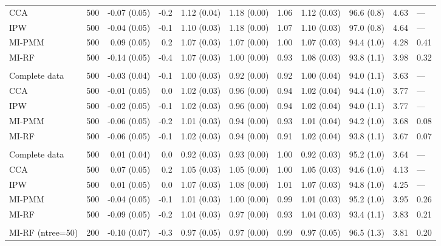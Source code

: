 \begin{longtable}{l|rrrrrrrrrl}
CCA & 500 & -0.07 (0.05) & -0.2 & 1.12 (0.04) & 1.18 (0.00) & 1.06 & 1.12 (0.03) & 96.6 (0.8) & 4.63 & — \\ 
IPW & 500 & -0.04 (0.05) & -0.1 & 1.10 (0.03) & 1.18 (0.00) & 1.07 & 1.10 (0.03) & 97.0 (0.8) & 4.64 & — \\ 
MI-PMM & 500 & 0.09 (0.05) & 0.2 & 1.07 (0.03) & 1.07 (0.00) & 1.00 & 1.07 (0.03) & 94.4 (1.0) & 4.28 & 0.41 \\ 
MI-RF & 500 & -0.14 (0.05) & -0.4 & 1.07 (0.03) & 1.00 (0.00) & 0.93 & 1.08 (0.03) & 93.8 (1.1) & 3.98 & 0.32 \\ 
\midrule\addlinespace[2.5pt]
\multicolumn{11}{l}{Stunting — MAR 10\%} \\[2.5pt] 
\midrule\addlinespace[2.5pt]
Complete data & 500 & -0.03 (0.04) & -0.1 & 1.00 (0.03) & 0.92 (0.00) & 0.92 & 1.00 (0.04) & 94.0 (1.1) & 3.63 & — \\ 
CCA & 500 & -0.01 (0.05) & 0.0 & 1.02 (0.03) & 0.96 (0.00) & 0.94 & 1.02 (0.04) & 94.4 (1.0) & 3.77 & — \\ 
IPW & 500 & -0.02 (0.05) & -0.1 & 1.02 (0.03) & 0.96 (0.00) & 0.94 & 1.02 (0.04) & 94.0 (1.1) & 3.77 & — \\ 
MI-PMM & 500 & -0.06 (0.05) & -0.2 & 1.01 (0.03) & 0.94 (0.00) & 0.93 & 1.01 (0.04) & 94.2 (1.0) & 3.68 & 0.08 \\ 
MI-RF & 500 & -0.06 (0.05) & -0.1 & 1.02 (0.03) & 0.94 (0.00) & 0.91 & 1.02 (0.04) & 93.8 (1.1) & 3.67 & 0.07 \\ 
\midrule\addlinespace[2.5pt]
\multicolumn{11}{l}{Stunting — MAR 30\%} \\[2.5pt] 
\midrule\addlinespace[2.5pt]
Complete data & 500 & 0.01 (0.04) & 0.0 & 0.92 (0.03) & 0.93 (0.00) & 1.00 & 0.92 (0.03) & 95.2 (1.0) & 3.64 & — \\ 
CCA & 500 & 0.07 (0.05) & 0.2 & 1.05 (0.03) & 1.05 (0.00) & 1.00 & 1.05 (0.03) & 94.6 (1.0) & 4.13 & — \\ 
IPW & 500 & 0.01 (0.05) & 0.0 & 1.07 (0.03) & 1.08 (0.00) & 1.01 & 1.07 (0.03) & 94.8 (1.0) & 4.25 & — \\ 
MI-PMM & 500 & -0.04 (0.05) & -0.1 & 1.01 (0.03) & 1.00 (0.00) & 0.99 & 1.01 (0.03) & 95.2 (1.0) & 3.95 & 0.26 \\ 
MI-RF & 500 & -0.09 (0.05) & -0.2 & 1.04 (0.03) & 0.97 (0.00) & 0.93 & 1.04 (0.03) & 93.4 (1.1) & 3.83 & 0.21 \\ 
\midrule\addlinespace[2.5pt]
\multicolumn{11}{l}{Stunting — MAR 30\% (ntree=50)} \\[2.5pt] 
\midrule\addlinespace[2.5pt]
MI-RF (ntree=50) & 200 & -0.10 (0.07) & -0.3 & 0.97 (0.05) & 0.97 (0.00) & 0.99 & 0.97 (0.05) & 96.5 (1.3) & 3.81 & 0.20 \\ 

\end{longtable}
